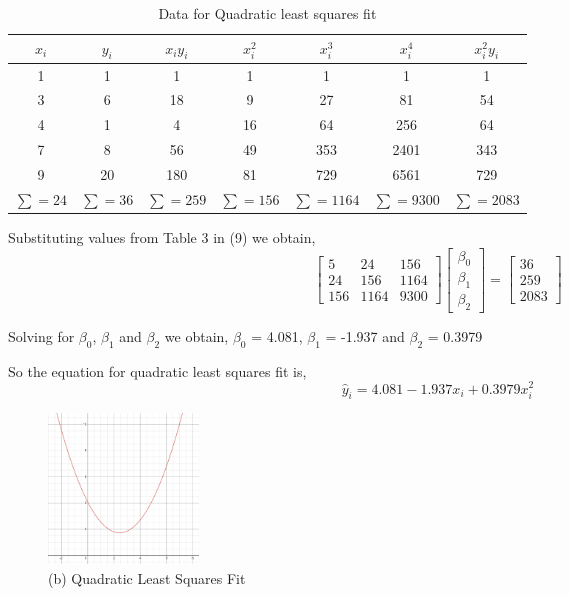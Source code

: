 \documentclass{scrartcl}
\begin{document}
\begin{table}[ht]
    \centering
    \begin{tabular}{|c|c|c|c|c|c|c|}
    \hline
        $x_i$ & $y_i$ & $x_iy_i$ & $x_i^2$ & $x_i^3$ & $x_i^4$ & $x_i^{2}y_i$\\ [0.5ex]
    \hline \hline
        1 & 1 & 1 & 1 & 1 & 1 & 1\\
    \hline
        3 & 6 & 18 & 9 & 27 & 81 & 54\\
    \hline
        4 & 1 & 4 & 16 & 64 & 256 & 64\\
    \hline
        7 & 8 & 56 & 49 & 353 & 2401 & 343\\
    \hline
        9 & 20 & 180 & 81 & 729 & 6561 & 729\\
    \hline
        $\sum=24$ & $\sum=36$ & $\sum=259$ & $\sum=156$ & $\sum=1164$ & $\sum=9300$ & $\sum=2083$\\
        [0.5ex]
    \hline
    \end{tabular}
    \caption{Data for Quadratic least squares fit}
    \label{tab:quad}
\end{table}

Substituting values from Table 3 in (9) we obtain, \\
$$
 \begin{bmatrix} 5 & 24 & 156\\ 24 & 156 & 1164\\ 156 & 1164 & 9300 \end{bmatrix}
\begin{bmatrix} \beta_{0}\\ \beta_{1} \\ \beta_{2} \end{bmatrix} 
= \begin{bmatrix} 36\\ 259\\ 2083 \end{bmatrix}
$$

Solving for $\beta_{0}$, $\beta_{1}$ and $\beta_{2}$ we obtain,
$\beta_{0}$ = 4.081, $\beta_{1}$ = -1.937 and $\beta_{2}$ = 0.3979

So the equation for quadratic least squares fit is,\\
\begin{equation}
\hat y_i=4.081-1.937x_i+0.3979x_i^2  
\end{equation}

\begin{figure}[ht]
    \centering
    \includegraphics[width=4cm, height=4cm]{quadraticfit.png}
    \caption{(b) Quadratic Least Squares Fit}
    \label{fig:qf}
\end{figure}
\end{document}
